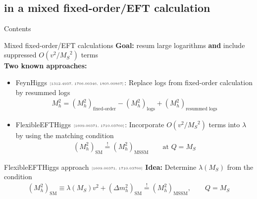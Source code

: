 \documentclass[hyperref={pdfpagelabels=false},ngerman]{beamer}
\newcommand{\MS}{\ensuremath{M_S}}
\newcommand{\mycite}[1]{\ensuremath{\text{\textcolor{darkgray}{\tiny [#1]}}}}
\renewcommand{\emph}{\textbf}
\newcommand{\SM}{\ensuremath{\text{SM}}}
\newcommand{\MSSM}{\ensuremath{\text{MSSM}}}
\begin{document}

\subsection{in a mixed fixed-order/EFT calculation}

\begin{frame}{Contents}
  \tableofcontents[
  currentsection,
  currentsubsection,
  subsectionstyle=show/shaded/hide]  
\end{frame}

\begin{frame}{Mixed fixed-order/EFT calculations}
  \emph{Goal:} resum large logarithms \emph{and} include suppressed
  $O(v^2/\MS^2)$ terms
  \\[2em]
  \emph{Two known approaches:}
  \begin{itemize}
  \item FeynHiggs \mycite{1312.4937, 1706.00346, 1805.00867}: Replace logs from
    fixed-order calculation by resummed logs
    \begin{align*}
      M_h^2 = (M_h^2)_{\text{fixed-order}} - (M_h^2)_{\text{logs}} + (M_h^2)_{\text{resummed logs}}
    \end{align*}
  \item FlexibleEFTHiggs \mycite{1609.00371, 1710.03760}: Incorporate
    $O(v^2/\MS^2)$ terms into $\lambda$ by using the matching
    condition
    \begin{align*}
      (M_h^2)_{\SM} \overset{!}{=} (M_h^2)_{\MSSM} \qquad \text{at } Q = \MS
    \end{align*}
  \end{itemize}
\end{frame}

\begin{frame}{FlexibleEFTHiggs approach \mycite{1609.00371, 1710.03760}}
  \emph{Idea:}
  Determine $\lambda(\MS)$ from the condition
  \begin{align*}
    (M_h^2)_{\SM} \equiv \lambda(\MS) v^2 + (\Delta m_h^2)_{\SM} \overset{!}{=} (M_h^2)_{\MSSM} , \qquad Q = \MS
  \end{align*}
  \begin{center}
  \end{center}
\end{frame}
\end{document}
